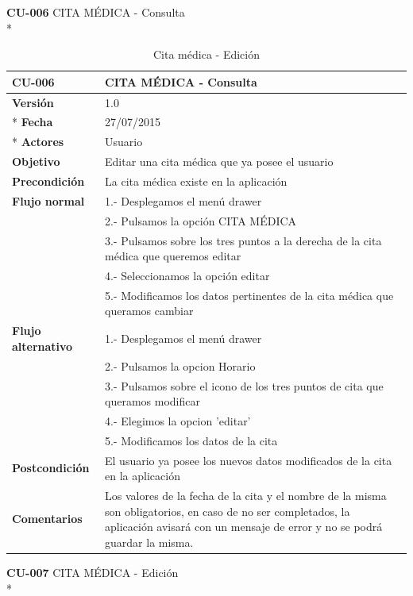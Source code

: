 \documentclass[../pfc.tex]{subfiles}
\begin{document}
	\textbf{CU-006}	CITA MÉDICA - Consulta\\*
	
		\begin{table}[H]
			\centering
			\begin{tabular}[t]{|p{3cm}|p{9.5cm}|}
				\hline \textbf{CU-006} & \textbf{CITA MÉDICA - Consulta} \\*
				\hline\hline \textbf{Versión} & 1.0 \\ *
				\hline\hline \textbf{Fecha} & 27/07/2015 \\ *
				\hline\textbf{Actores} 	& Usuario\\*
				\hline \textbf{Objetivo} & Editar una cita médica que ya posee el usuario\\* 			
				\hline \textbf{Precondición} & La cita médica existe en la aplicación\\* 
				\hline \textbf{Flujo normal} & 1.- Desplegamos el menú drawer \\* 
				& 2.- Pulsamos la opción CITA MÉDICA\\*	
				& 3.- Pulsamos sobre los tres puntos a la derecha de la cita médica que queremos editar\\*	
				& 4.- Seleccionamos la opción editar\\*	
				& 5.- Modificamos los datos pertinentes de la cita médica que queramos cambiar\\*	
				\hline \textbf{Flujo alternativo} & 1.- Desplegamos el menú drawer \\* 
				& 2.- Pulsamos la opcion Horario \\*	
				& 3.- Pulsamos sobre el icono de los tres puntos de cita que queramos modificar \\*	
				& 4.- Elegimos la opcion 'editar'\\*	
				& 5.- Modificamos los datos de la cita\\*	
				\hline \textbf{Postcondición} & El usuario ya posee los nuevos datos modificados de la cita en la aplicación \\* 
				\hline \textbf{Comentarios}   & Los valores de la fecha de la cita y el nombre de la misma son obligatorios, en caso de no ser completados, la aplicación avisará con un mensaje de error y no se podrá guardar la misma.\\*
				\hline
			\end{tabular}
			\caption{Cita médica - Edición}
			\label{tabla:caso006}
		\end{table}
		
	\textbf{CU-007}	CITA MÉDICA - Edición\\*
	
\end{document}
